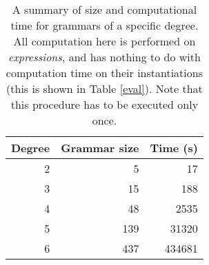 \begin{table}[t]
\tiny
\centering
\begin{tabular}{rrr}
\hline
Degree & Grammar size & Time (s) \\
\hline
2 & 5 & 17 \\
3 & 15 & 188 \\
4 & 48 & 2535\\
5 & 139 & 31320 \\
6 & 437 & 434681 \\
\hline
\end{tabular}
\caption{A summary of size and computational time for grammars of a specific degree. 
  All computation here is performed on {\em expressions}, and has
  nothing to do with computation time on their instantiations (this is
  shown in Table \ref{eval}). Note that this procedure has to be executed only once.}
\label{grammars}
\vspace{-4mm}
\end{table}

